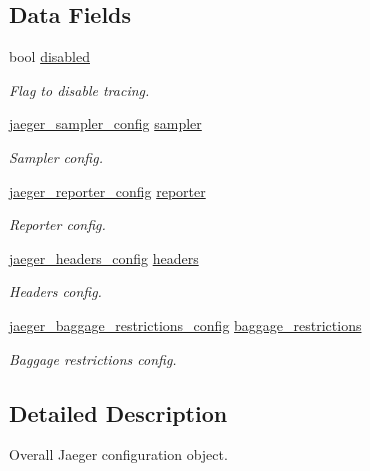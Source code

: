 \subsection*{Data Fields}
\begin{DoxyCompactItemize}
\item 
bool \mbox{\hyperlink{structjaeger__config_a3edfc4072b15da75a19efb85ea781726}{disabled}}
\begin{DoxyCompactList}\small\item\em Flag to disable tracing. \end{DoxyCompactList}\item 
\mbox{\hyperlink{structjaeger__sampler__config}{jaeger\+\_\+sampler\+\_\+config}} \mbox{\hyperlink{structjaeger__config_a812f67f2637466de160309af68951713}{sampler}}
\begin{DoxyCompactList}\small\item\em Sampler config. \end{DoxyCompactList}\item 
\mbox{\hyperlink{structjaeger__reporter__config}{jaeger\+\_\+reporter\+\_\+config}} \mbox{\hyperlink{structjaeger__config_a5bd07c1b0274f5026ccafd4bbc7260c7}{reporter}}
\begin{DoxyCompactList}\small\item\em Reporter config. \end{DoxyCompactList}\item 
\mbox{\hyperlink{structjaeger__headers__config}{jaeger\+\_\+headers\+\_\+config}} \mbox{\hyperlink{structjaeger__config_a200401ea8b4175a4888dcb1d296ef73d}{headers}}
\begin{DoxyCompactList}\small\item\em Headers config. \end{DoxyCompactList}\item 
\mbox{\hyperlink{structjaeger__baggage__restrictions__config}{jaeger\+\_\+baggage\+\_\+restrictions\+\_\+config}} \mbox{\hyperlink{structjaeger__config_a33fd9cfa26f4b54cb9a7abfd405f2723}{baggage\+\_\+restrictions}}
\begin{DoxyCompactList}\small\item\em Baggage restrictions config. \end{DoxyCompactList}\end{DoxyCompactItemize}


\subsection{Detailed Description}
Overall Jaeger configuration object. 



